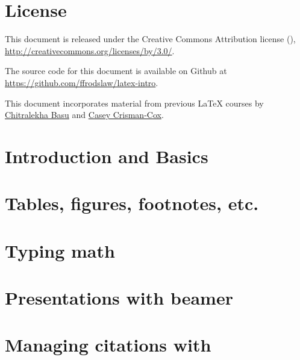 


\begin{titlepage}

\maketitle

\vspace*{4cm}

\end{titlepage}

{}

\newpage

\section*{License}
\thispagestyle{empty}

\noindent%
This document is released under the Creative Commons Attribution license
(\ccby), {\small \url{http://creativecommons.org/licenses/by/3.0/}}.

\bigskip%
\noindent%
The source code for this document is available on Github at
{\small \url{https://github.com/ffrodslaw/latex-intro}}.

\bigskip%
\noindent%
This document incorporates material from previous \LaTeX{} courses by \href{http://www.chitralekha-basu.com/uploads/6/3/0/3/63033901/latex_for_absolute_beginners_-_part_one.pdf}{Chitralekha Basu} and  \href{https://drive.google.com/open?id=0BzD2LimxGIzIY083V0EzQUt6UmM}{Casey Crisman-Cox}.

\pagebreak

\tableofcontents

\pagebreak

\section{Introduction and Basics}


\section{Tables, figures, footnotes, etc.}


\section{Typing math}


\section{Presentations with beamer}
	

\section{Managing citations with }



%



